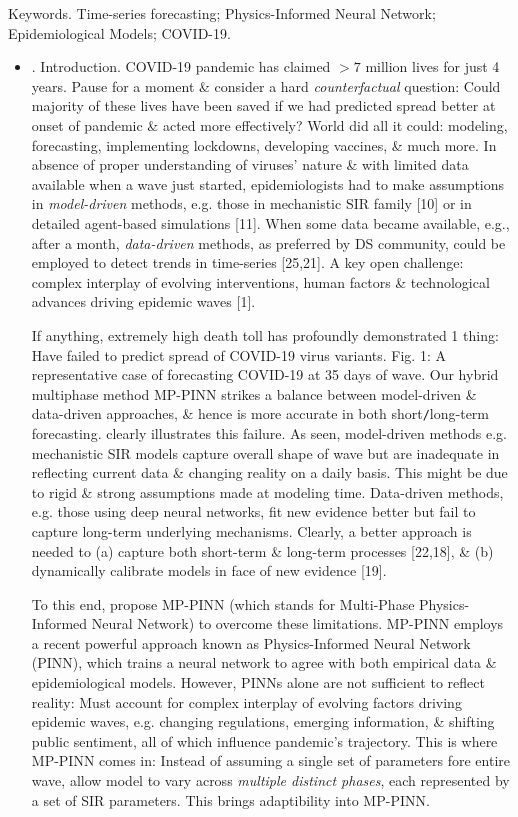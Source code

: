 \documentclass{article}
\begin{document}
{\sf Keywords.} Time-series forecasting; Physics-Informed Neural Network; Epidemiological Models; COVID-19.
\begin{itemize}
	\item {. Introduction.} COVID-19 pandemic has claimed $> 7$ million lives for just 4 years. Pause for a moment \& consider a hard {\it counterfactual} question: Could majority of these lives have been saved if we had predicted spread better at onset of pandemic \& acted more effectively? World did all it could: modeling, forecasting, implementing lockdowns, developing vaccines, \& much more. In absence of proper understanding of viruses' nature \& with limited data available when a wave just started, epidemiologists had to make assumptions in {\it model-driven} methods, e.g. those in mechanistic SIR family [10] or in detailed agent-based simulations [11]. When some data became available, e.g., after a month, {\it data-driven} methods, as preferred by DS community, could be employed to detect trends in time-series [25,21]. A key open challenge: complex interplay of evolving interventions, human factors \& technological advances driving epidemic waves [1].
	
	If anything, extremely high death toll has profoundly demonstrated 1 thing: Have failed to predict spread of COVID-19 virus variants. {\sf Fig. 1: A representative case of forecasting COVID-19 at 35 days of wave. Our hybrid multiphase method MP-PINN strikes a balance between model-driven \& data-driven approaches, \& hence is more accurate in both short{\tt/}long-term forecasting.} clearly illustrates this failure. As seen, model-driven methods e.g. mechanistic SIR models capture overall shape of wave but are inadequate in reflecting current data \& changing reality on a daily basis. This might be due to rigid \& strong assumptions made at modeling time. Data-driven methods, e.g. those using deep neural networks, fit new evidence better but fail to capture long-term underlying mechanisms. Clearly, a better approach is needed to (a) capture both short-term \& long-term processes [22,18], \& (b) dynamically calibrate models in face of new evidence [19].
	
	To this end, propose MP-PINN (which stands for Multi-Phase Physics-Informed Neural Network) to overcome these limitations. MP-PINN employs a recent powerful approach known as Physics-Informed Neural Network (PINN), which trains a neural network to agree with both empirical data \& epidemiological models. However, PINNs alone are not sufficient to reflect reality: Must account for complex interplay of evolving factors driving epidemic waves, e.g. changing regulations, emerging information, \& shifting public sentiment, all of which influence pandemic's trajectory. This is where MP-PINN comes in: Instead of assuming a single set of parameters fore entire wave, allow model to vary across {\it multiple distinct phases}, each represented by a set of SIR parameters. This brings adaptibility into MP-PINN.
	

\end{itemize}
\end{document}
